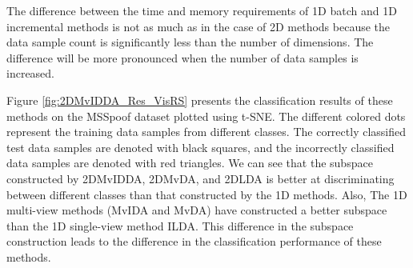\begin{itemize}
The difference between the time and memory requirements of 1D batch and 1D incremental methods is not as much as in the case of 2D methods because the data sample count is significantly less than the number of dimensions. The difference will be more pronounced when the number of data samples is increased.

Figure \ref{fig:2DMvIDDA_Res_VisRS} presents the classification results of these methods on the MSSpoof dataset plotted using t-SNE. The different colored dots represent the training data samples from different classes. The correctly classified test data samples are denoted with black squares, and the incorrectly classified data samples are denoted with red triangles. We can see that the subspace constructed by 2DMvIDDA, 2DMvDA, and 2DLDA is better at discriminating between different classes than that constructed by the 1D methods. Also, The 1D multi-view methods (MvIDA and MvDA) have constructed a better subspace than the 1D single-view method ILDA. This difference in the subspace construction leads to the difference in the classification performance of these methods.
\end{itemize}





